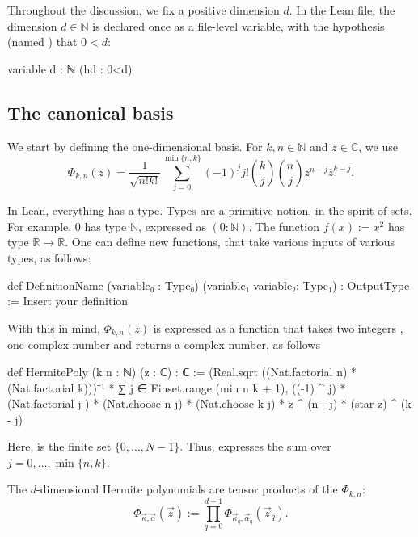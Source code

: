 \documentclass[11pt]{amsart}
\theoremstyle{remark}
\begin{document}
Throughout the discussion, we fix a positive dimension $d$.  In the Lean file,
the dimension $d \in \mathbb N$ is declared once as a file-level variable, with the hypothesis (named ) that $0<d$:
\begin{leancode}
variable {d : ℕ} (hd : 0<d)
\end{leancode}




\subsection{The canonical basis}

We start by defining the one-dimensional basis. For $k,n \in \mathbb N$ and
$z\in \mathbb C$, we use
\begin{equation*}
    \Phi_{k,n}(z) = \frac{1}{\sqrt{n!k!}}
    \sum_{j=0}^{\min\{n,k\}}(-1)^j j!
    \binom{k}{j}\binom{n}{j} z^{n-j}\overline{z}^{k-j}.
\end{equation*}


In Lean, everything has a type. Types are a primitive notion, in the spirit of sets. For example, $0$ has type $\mathbb N$, expressed as $(0:\mathbb N)$. The function $f(x) := x^2$ has type $\mathbb R \to \mathbb R$. One can define new functions, that take various inputs of various types, as follows:
\begin{leancode}
def DefinitionName (variable₀ : Type₀) (variable₁ variable₂: Type₁) : OutputType :=
    Insert your definition
\end{leancode}
With this in mind, $\Phi_{k,n}(z)$ is expressed as a function  that takes two integers , one complex number  and returns a complex number, as follows
\begin{leancode}
def HermitePoly (k n : ℕ) (z : ℂ) : ℂ :=
  (Real.sqrt ((Nat.factorial n) * (Nat.factorial k)))⁻¹ *
    ∑ j ∈ Finset.range (min n k + 1),
      ((-1) ^ j) * (Nat.factorial j ) *
        (Nat.choose n j) * (Nat.choose k j) *
        z ^ (n - j) * (star z) ^ (k - j)
\end{leancode}
Here, {} is the finite set $\{0,\ldots,N-1\}$.  Thus, 
{} 
expresses the sum over $j=0,\ldots,\min\{n,k\}$.
 \vspace{0.5em}

The $d$-dimensional Hermite polynomials are tensor products of the $\Phi_{k,n}$:
\[
\Phi_{\vec\kappa,\vec\alpha}(\vec z)
:=\prod_{q=0}^{d-1}\Phi_{\vec\kappa_q,\vec\alpha_q}(\vec z_q).
\]
\end{document}
